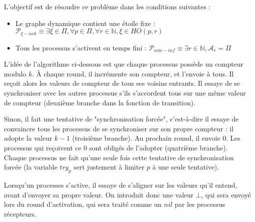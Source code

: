 \documentclass{article}
\begin{document}
L'objectif est de résoudre ce problème dans les conditions suivantes :
\begin{itemize}

	\item Le graphe dynamique contient une étoile fixe : $\mathcal{P}_{\xi-nek} \equiv \exists \xi \in \Pi, \forall p \in \Pi, \forall r \in \mathds{N}, \xi \in HO(p, r)$
	\item Tous les processus s'activent en temps fini : $\mathcal{P}_{non-inf} \equiv \exists r \in \mathds{N}, \mathcal{A}_r = \Pi$

\end{itemize}

L'idée de l'algorithme ci-dessous est que chaque processus possède un compteur modulo $k$. À chaque round, il incrémente son compteur, et l'envoie à tous.
Il reçoit alors les valeurs de compteur de tous ses voisins entrants. Il essaye de se synchroniser avec les autres processus s'ils s'accordent tous sur une même valeur de compteur
(deuxième branche dans la fonction de transition).

Sinon, il fait une tentative de "synchronisation forcée", c'est-à-dire il essaye de convaincre tous les processus de se synchroniser sur son propre compteur :
il adopte la valeur $k-1$ (troisième branche). Au prochain round, il envoie 0.  Les processus qui reçoivent ce 0 sont obligés de l'adopter (quatrième branche).
Chaque processus ne fait qu'une seule fois cette tentative de synchronisation forcée (la variable $try_p$ sert justement à limiter $p$ à une seule tentative).

Lorsqu'un processes s'active, il essaye de s'aligner sur les valeurs qu'il entend, avant d'envoyer sa propre valeur.
On introduit donc une valeur $\bot$, qui sera envoyé lors du round d'activation, qui sera traité comme un $nil$ par les processus récepteurs.

\pagebreak[1]
\end{document}
